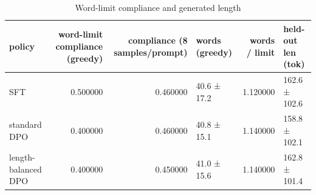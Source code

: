 \begin{table}
\caption{Word-limit compliance and generated length}
\label{tab:t1_word_limit}
\begin{tabular}{lrrlrl}
\toprule
policy & word-limit compliance (greedy) & compliance (8 samples/prompt) & words (greedy) & words / limit & held-out len (tok) \\
\midrule
SFT & 0.500000 & 0.460000 & 40.6 ± 17.2 & 1.120000 & 162.6 ± 102.6 \\
standard DPO & 0.400000 & 0.460000 & 40.8 ± 15.1 & 1.140000 & 158.8 ± 102.1 \\
length-balanced DPO & 0.400000 & 0.450000 & 41.0 ± 15.6 & 1.140000 & 162.8 ± 101.4 \\
\bottomrule
\end{tabular}
\end{table}
